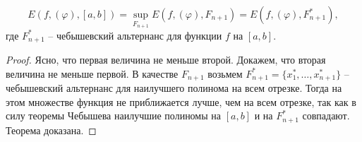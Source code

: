 \begin{teo}[об очистке]
$$
E(f,(\varphi),[a,b])=\sup_{F_{n+1}} E(f,(\varphi),F_{n+1})=
E(f,(\varphi),F_{n+1}^*),
$$
где $F_{n+1}^*$ -- чебышевский альтернанс для функции $f$
на $[a,b].$
\end{teo}

\begin{proof}
Ясно, что первая величина не меньше второй.
Докажем, что вторая величина не меньше первой.
В качестве $F_{n+1}$ возьмем $F_{n+1}^*=\{x_1^*,\ldots,x_{n+1}^*\}$ -- чебышевский альтернанс
для наилучшего полинома на всем отрезке. Тогда на этом множестве
функция не приближается лучше, чем на всем отрезке, так как в силу теоремы
Чебышева наилучшие полиномы на $[a,b]$ и на $F_{n+1}^*$ совпадают. Теорема доказана.
\end{proof}
